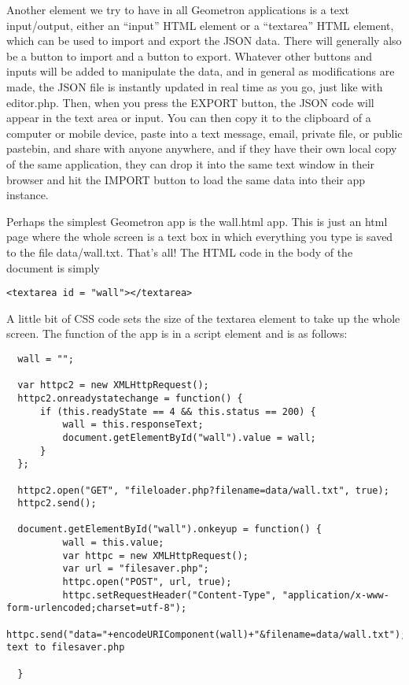 Another element we try to have in all Geometron applications is a text input/output, either an ``input'' HTML element or a ``textarea'' HTML element, which can be used to import and export the JSON data. There will generally also be a button to import and a button to export.  Whatever other buttons and inputs will be added to manipulate the data, and in general as modifications are made, the JSON file is instantly updated in real time as you go, just like with editor.php.  Then, when you press the EXPORT button, the JSON code will appear in the text area or input.  You can then copy it to the clipboard of a computer or mobile device, paste into a text message, email, private file, or public pastebin, and share with anyone anywhere, and if they have their own local copy of the same application, they can drop it into the same text window in their browser and hit the IMPORT button to load the same data into their app instance.  

Perhaps the simplest Geometron app is the wall.html app.  This is just an html page where the whole screen is a text box in which everything you type is saved to the file data/wall.txt.  That's all! The HTML code in the body of the document is simply 

\begin{verbatim}
<textarea id = "wall"></textarea>
\end{verbatim}

A little bit of CSS code sets the size of the textarea element to take up the whole screen. The function of the app is in a script element and is as follows:

\begin{verbatim}
  wall = "";

  var httpc2 = new XMLHttpRequest();
  httpc2.onreadystatechange = function() {
      if (this.readyState == 4 && this.status == 200) {
          wall = this.responseText;
          document.getElementById("wall").value = wall;
      }
  };
  
  httpc2.open("GET", "fileloader.php?filename=data/wall.txt", true);
  httpc2.send();
  
  document.getElementById("wall").onkeyup = function() {
          wall = this.value;
          var httpc = new XMLHttpRequest();
          var url = "filesaver.php";        
          httpc.open("POST", url, true);
          httpc.setRequestHeader("Content-Type", "application/x-www-form-urlencoded;charset=utf-8");
          httpc.send("data="+encodeURIComponent(wall)+"&filename=data/wall.txt");//send text to filesaver.php        
      
  }
\end{verbatim}

